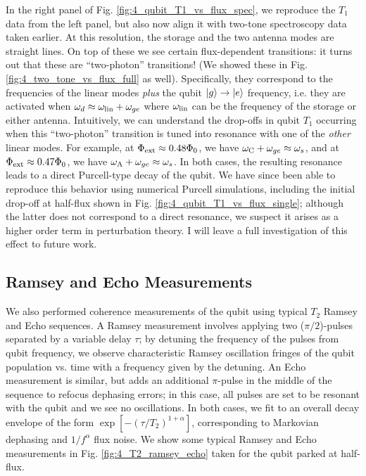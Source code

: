 In the right panel of Fig. \ref{fig:4_qubit_T1_vs_flux_spec}, we reproduce the $T_1$ data from the left panel, but also now align it with two-tone spectroscopy data taken earlier. At this resolution, the storage and the two antenna modes are straight lines. On top of these we see certain flux-dependent transitions: it turns out that these are ``two-photon'' transitions! (We showed these in Fig. \ref{fig:4_two_tone_vs_flux_full} as well). Specifically, they correspond to the frequencies of the linear modes \textit{plus} the qubit $\lvert g\rangle\to\lvert e\rangle$ frequency, i.e. they are activated when $\omega_d \approx \omega_{\rm lin} + \omega_{ge}$ where $\omega_{\rm lin}$ can be the frequency of the storage or either antenna. Intuitively, we can understand the drop-offs in qubit $T_1$ occurring when this ``two-photon'' transition is tuned into resonance with one of the \textit{other} linear modes. For example, at $\Phi_{\rm ext} \approx 0.48\Phi_0$, we have $\omega_{\rm C} + \omega_{ge} \approx \omega_{s}$, and at $\Phi_{\rm ext} \approx 0.47\Phi_0$, we have $\omega_{\rm A} + \omega_{ge} \approx \omega_{s}$. In both cases, the resulting resonance leads to a direct Purcell-type decay of the qubit. We have since been able to reproduce this behavior using numerical Purcell simulations, including the initial drop-off at half-flux shown in Fig. \ref{fig:4_qubit_T1_vs_flux_single}; although the latter does not correspond to a direct resonance, we suspect it arises as a higher order term in perturbation theory. I will leave a full investigation of this effect to future work. 

\subsection{Ramsey and Echo Measurements}

We also performed coherence measurements of the qubit using typical $T_2$ Ramsey and Echo sequences. A Ramsey measurement involves applying two ($\pi/2$)-pulses separated by a variable delay $\tau$; by detuning the frequency of the pulses from qubit frequency, we observe characteristic Ramsey oscillation fringes of the qubit population vs. time with a frequency given by the detuning. An Echo measurement is similar, but adds an additional $\pi$-pulse in the middle of the sequence to refocus dephasing errors; in this case, all pulses are set to be resonant with the qubit and we see no oscillations. In both cases, we fit to an overall decay envelope of the form $\exp[-(\tau/T_2)^{1 +\alpha}]$, corresponding to Markovian dephasing and $1/f^\alpha$ flux noise. We show some typical Ramsey and Echo measurements in Fig. \ref{fig:4_T2_ramsey_echo} taken for the qubit parked at half-flux.

